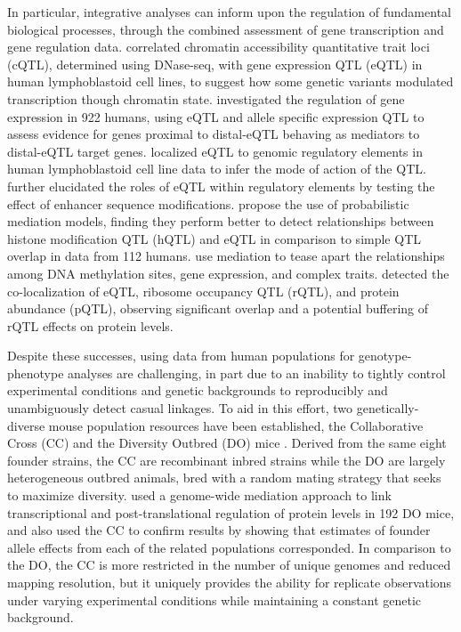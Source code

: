 \documentclass[9pt,twocolumn,twoside]{gsajnl}
\begin{document}
In particular, integrative analyses can inform upon the regulation of fundamental biological processes, through the combined assessment of gene transcription and gene regulation data. \cite{Degner2012} correlated chromatin accessibility quantitative trait loci (cQTL), determined using DNase-seq, with gene expression QTL (eQTL) in human lymphoblastoid cell lines, to suggest how some genetic variants modulated transcription though chromatin state. \cite{Battle2014} investigated the regulation of gene expression in 922 humans, using eQTL and allele specific expression QTL to assess evidence for genes proximal to distal-eQTL behaving as mediators to distal-eQTL target genes. \cite{Pai2015} localized eQTL to genomic regulatory elements in human lymphoblastoid cell line data to infer the mode of action of the QTL. \cite{Alasoo2017} further elucidated the roles of eQTL within regulatory elements by testing the effect of enhancer sequence modifications. \cite{Roytman2018} propose the use of probabilistic mediation models, finding they perform better to detect relationships between histone modification QTL (hQTL) and eQTL in comparison to simple QTL overlap in data from 112 humans. \cite{Wu2018} use mediation to tease apart the relationships among DNA methylation sites, gene expression, and complex traits. \cite{Battle2015} detected the co-localization of eQTL, ribosome occupancy QTL (rQTL), and protein abundance (pQTL), observing significant overlap and a potential buffering of rQTL effects on protein levels.

Despite these successes, using data from human populations for genotype-phenotype analyses are challenging, in part due to an inability to tightly control experimental conditions and genetic backgrounds to reproducibly and unambiguously detect casual linkages. To aid in this effort, two genetically-diverse mouse population resources have been established, the Collaborative Cross (CC) \citep{Churchill2004,Hall2012,Srivastava2017} and the Diversity Outbred (DO) mice \citep{Churchill2012}. Derived from the same eight founder strains, the CC are recombinant inbred strains while the DO are largely heterogeneous outbred animals, bred with a random mating strategy that seeks to maximize diversity. \cite{Chick2016} used a genome-wide mediation approach to link transcriptional and post-translational regulation of protein levels in 192 DO mice, and also used the CC to confirm results by showing that estimates of founder allele effects from each of the related populations corresponded. In comparison to the DO, the CC is more restricted in the number of unique genomes and reduced mapping resolution, but it uniquely provides the ability for replicate observations under varying experimental conditions while maintaining a constant genetic background.
\end{document}
